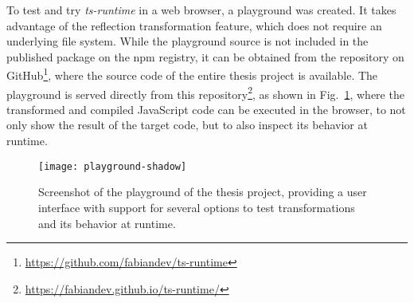 To test and try \emph{ts-runtime} in a web browser, a playground was created. It takes advantage of the reflection transformation feature, which does not require an underlying file system. While the playground source is not included in the published package on the npm registry, it can be obtained from the repository on GitHub\footnote{\url{https://github.com/fabiandev/ts-runtime}}, where the source code of the entire thesis project is available. The playground is served directly from this repository\footnote{\url{https://fabiandev.github.io/ts-runtime/}}, as shown in Fig.~\ref{fig:playground}, where the transformed and compiled JavaScript code can be executed in the browser, to not only show the result of the target code, but to also inspect its behavior at runtime.
\begin{figure}
\centering
\texttt{[image: playground-shadow]}
\caption{Screenshot of the playground of the thesis project, providing a user interface with support for several options to test transformations and its behavior at runtime.}
\label{fig:playground}
\end{figure}
